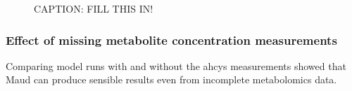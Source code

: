 \documentclass[journal=,manuscript=]{achemso}
\begin{document}
\begin{figure}

\begin{minipage}[t]{\linewidth}

{\centering 


}

\end{minipage}%

\caption{\label{fig-laplace}CAPTION: FILL THIS IN!}

\end{figure}

\hypertarget{effect-of-missing-metabolite-concentration-measurements}{%
\subsubsection{Effect of missing metabolite concentration
measurements}\label{effect-of-missing-metabolite-concentration-measurements}}

Comparing model runs with and without the ahcys measurements showed that
Maud can produce sensible results even from incomplete metabolomics
data.
\end{document}
